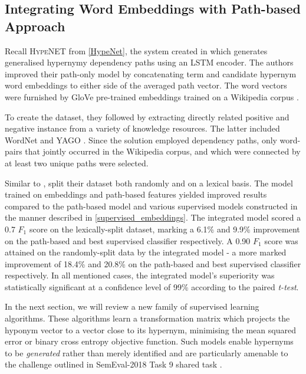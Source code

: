 \subsection{Integrating Word Embeddings with Path-based Approach}
Recall \textsc{HypeNET} from \cref{HypeNet}, the system created in \citep{shwartz2016path} which generates generalised hypernymy dependency paths using an \ac{LSTM} \citep{hochreiter1997long} encoder. The authors improved their path-only model by concatenating term and candidate hypernym word embeddings to either side of the averaged path vector.  The word vectors were furnished by GloVe pre-trained embeddings trained on a Wikipedia corpus \citep{pennington2014glove}.

To create the dataset, they followed \citet{Snow2004} by extracting directly related positive and negative instance from a variety of knowledge resources.  The latter included WordNet \citep{Miller1995} and YAGO \citep{suchanek2007yago}.  Since the solution employed dependency paths, only word-pairs that jointly occurred in the Wikipedia corpus, and which were connected by at least two unique paths were selected.

Similar to \citet{levy2015supervised}, \citeauthor{shwartz2016path} split their dataset both randomly and on a lexical basis.  The model trained on embeddings and path-based features yielded improved results compared to the path-based model and various supervised models constructed in the manner described in \ref{supervised_embeddings}.  The integrated model scored a 0.7 $F_1$ score on the lexically-split dataset, marking a 6.1\% and 9.9\% improvement on the path-based and best supervised classifier respectively.  A 0.90 $F_1$ score was attained on the randomly-split data by the integrated model -  a more marked improvement of 18.4\% and 20.8\% on the path-based and best supervised classifier respectively.  In all mentioned cases, the integrated model's superiority was statistically significant at a confidence level of 99\% according to the paired \textit{t-test}. 

In the next section, we will review a new family of supervised learning algorithms.  These algorithms learn a transformation matrix which projects the hyponym vector to a vector close to its hypernym, minimising the mean squared error or binary cross entropy objective function.  Such models enable hypernyms to be \textit{generated} rather than merely identified and are particularly amenable to the challenge outlined in SemEval-2018 Task 9 shared task \citep{camacho2018semeval}.

